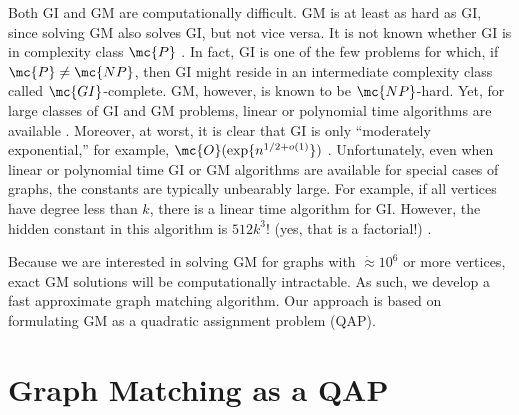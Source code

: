 \documentclass[10pt,journal,cspaper,compsoc]{IEEEtran}
\begin{document}
Both GI and GM are computationally difficult. GM is at least as hard as GI, since solving GM also solves GI, but not vice versa. It is not known whether GI is in complexity class $\mc{P}$ \cite{Fortin1996}.  In fact, GI is one of the few problems for which, if $\mc{P} \neq \mc{NP}$, then GI might reside in an intermediate complexity class called $\mc{GI}$-complete.  GM, however, is known to be $\mc{NP}$-hard.    
Yet, for large classes of GI and GM problems, linear or polynomial time algorithms are available \cite{Babai1980}.  Moreover, at worst, it is clear that GI is only ``moderately exponential,'' for example, $\mc{O}(\exp\{n^{1/2 + o(1)}\})$ \cite{Babai1981}.  Unfortunately, even when linear or polynomial time GI or GM algorithms are available for special cases of graphs, the constants are typically unbearably large.  For example, if all vertices have degree less than $k$, there is a linear time algorithm for GI.  However, the hidden constant in this algorithm is $512k^3!$ (yes, that is a factorial!) \cite{Chen1994}.  

Because we are interested in solving GM for graphs with $\dot{\approx} 10^6$ or more vertices, exact GM solutions will be computationally intractable. As such, we develop a fast approximate graph matching algorithm.   Our approach is based on formulating GM as a quadratic assignment problem (QAP).  %



\section{Graph  Matching as a QAP} %
\label{sub:preliminaries}

% 
\end{document}
